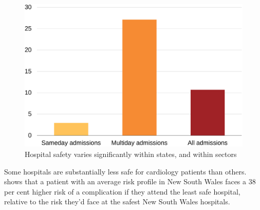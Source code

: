 \documentclass[FrontPage]{grattan}
\begin{document}
\begin{figure}
\caption{Hospital safety varies significantly within states, and within sectors}\label{fig:hospital-safety-varies-significantly-within-states-and-sectors}
\includegraphics[page=14]{atlas/comps_charts.pdf}
\end{figure}

Some hospitals are substantially less safe for cardiology patients than others.
 shows that a patient with an average risk profile in New South Wales faces a 38 per cent higher risk of a complication if they attend the least safe hospital, relative to the risk they'd face at the safest New South Wales hospitals.
\end{document}
